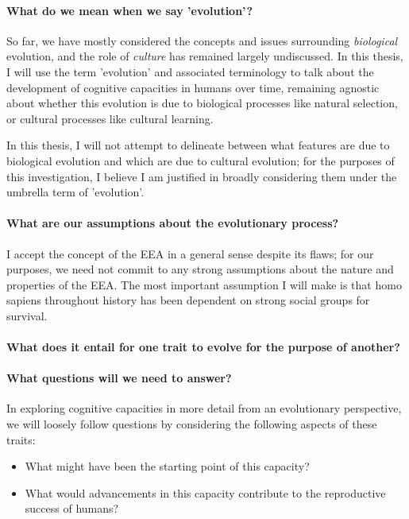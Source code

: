 \paragraph{What do we mean when we say 'evolution'?}

So far, we have mostly considered the concepts and issues surrounding \emph{biological} evolution, and the role of \emph{culture} has remained largely undiscussed.
In this thesis, I will use the term 'evolution' and associated terminology to talk about the development of cognitive capacities in humans over time, remaining agnostic about whether this evolution is due to biological processes like natural selection, or cultural processes like cultural learning.

 In this thesis, I will not attempt to delineate between what features are due to biological evolution and which are due to cultural evolution; for the purposes of this investigation, I believe I am justified in broadly considering them under the umbrella term of 'evolution'.
\paragraph{What are our assumptions about the evolutionary process?}

I accept the concept of the EEA in a general sense despite its flaws; for our purposes, we need not commit to any strong assumptions about the nature and properties of the EEA. The most important assumption I will make is that homo sapiens throughout history has been dependent on strong social groups for survival.

\paragraph{What does it entail for one trait to evolve for the purpose of another?}

\paragraph{What questions will we need to answer?}
In exploring cognitive capacities in more detail from an evolutionary perspective, we will loosely follow  questions by considering the following aspects of these traits:
\begin{itemize}
    \item What might have been the starting point of this capacity?
    \item What would advancements in this capacity contribute to the reproductive success of humans?
\end{itemize}
